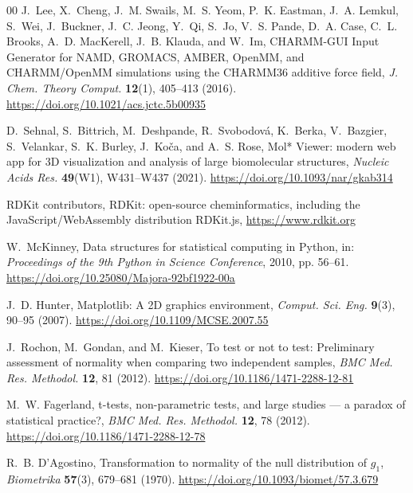 \documentclass[11pt,a4paper]{article}
\begin{document}
{\begin{thebibliography}{00}
J.~Lee, X.~Cheng, J.~M. Swails, M.~S. Yeom, P.~K. Eastman, J.~A. Lemkul,
  S.~Wei, J.~Buckner, J.~C. Jeong, Y.~Qi, S.~Jo, V.~S. Pande, D.~A. Case,
  C.~L. Brooks, A.~D. MacKerell, J.~B. Klauda, and W.~Im,
\newblock CHARMM-GUI Input Generator for NAMD, GROMACS, AMBER, OpenMM, and
  CHARMM/OpenMM simulations using the CHARMM36 additive force field,
\newblock \emph{J. Chem. Theory Comput.} \textbf{12}(1), 405--413 (2016).
\newblock \url{https://doi.org/10.1021/acs.jctc.5b00935}

D.~Sehnal, S.~Bittrich, M.~Deshpande, R.~Svobodov{\'a}, K.~Berka,
  V.~Bazgier, S.~Velankar, S.~K. Burley, J.~Ko{\v c}a, and A.~S. Rose,
\newblock Mol* Viewer: modern web app for 3D visualization and analysis of
  large biomolecular structures,
\newblock \emph{Nucleic Acids Res.} \textbf{49}(W1), W431--W437 (2021).
\newblock \url{https://doi.org/10.1093/nar/gkab314}

RDKit contributors,
\newblock RDKit: open-source cheminformatics, including the JavaScript/WebAssembly
  distribution RDKit.js,
\newblock \url{https://www.rdkit.org}

W.~McKinney,
\newblock Data structures for statistical computing in Python,
\newblock in: \emph{Proceedings of the 9th Python in Science Conference},
  2010, pp. 56--61.
\newblock \url{https://doi.org/10.25080/Majora-92bf1922-00a}

J.~D. Hunter,
\newblock Matplotlib: A 2D graphics environment,
\newblock \emph{Comput. Sci. Eng.} \textbf{9}(3), 90--95 (2007).
\newblock \url{https://doi.org/10.1109/MCSE.2007.55}

J.~Rochon, M.~Gondan, and M.~Kieser,
\newblock To test or not to test: Preliminary assessment of normality when
  comparing two independent samples,
\newblock \emph{BMC Med. Res. Methodol.} \textbf{12}, 81 (2012).
\newblock \url{https://doi.org/10.1186/1471-2288-12-81}

M.~W. Fagerland,
\newblock t-tests, non-parametric tests, and large studies --- a paradox of
  statistical practice?,
\newblock \emph{BMC Med. Res. Methodol.} \textbf{12}, 78 (2012).
\newblock \url{https://doi.org/10.1186/1471-2288-12-78}

R.~B. D'Agostino,
\newblock Transformation to normality of the null distribution of $g_1$,
\newblock \emph{Biometrika} \textbf{57}(3), 679--681 (1970).
\newblock \url{https://doi.org/10.1093/biomet/57.3.679}


\end{thebibliography}}
\end{document}
